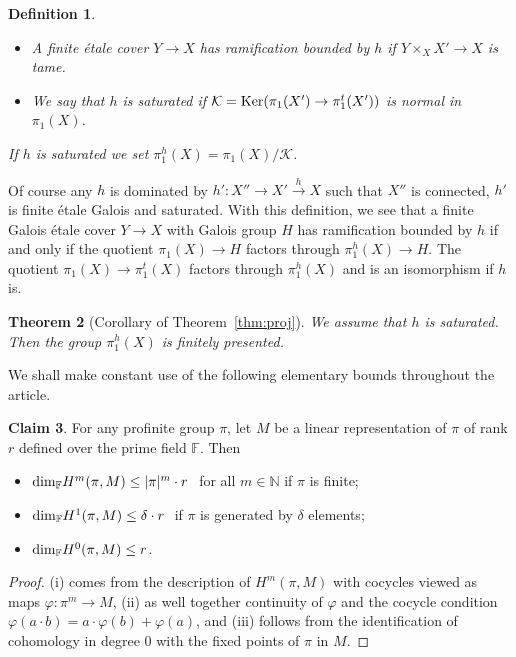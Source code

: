 \documentclass[12pt]{amsart}
\theoremstyle{plain}
\newtheorem{thm}{Theorem}
\newtheorem{defn}[thm]{Definition}
\theoremstyle{definition}
\newtheorem{claim}[thm]{Claim}
\numberwithin{thm}{section}
\newcommand{\sK}{{\mathcal K}}
\newcommand{\F}{{\mathbb F}}
\newcommand{\N}{{\mathbb N}}
\numberwithin{equation}{section}
\begin{document}
\begin{defn} \label{defn:drinfeld} 
\begin{itemize}
\item[1)]
 A finite \'etale cover $Y\to X$ has  ramification bounded by $h$ if $Y\times_X X'\to X$ is tame.
 \item[2)]
We say that $h$ is saturated if  $\sK={\rm Ker}(\pi_1(X')\to \pi_1^t(X'))$ is normal in $\pi_1(X)$. 
 \end{itemize}
 If $h$ is saturated we set $\pi_1^h(X)=\pi_1(X)/\sK$.
 \end{defn} 
 Of course any $h$ is dominated by $h': X''\to X'\xrightarrow{h} X$ such that $X''$ is connected, $h'$ is finite \'etale Galois and saturated. 
 With this definition, we see that a finite Galois \'etale cover $Y\to X$ with Galois group $H$ has ramification bounded by $h$ if and only if the quotient $\pi_1(X)\to H$ factors through $\pi_1^h(X)\to H$.  The quotient $\pi_1(X)\to \pi_1^t(X)$ factors through $\pi_1^h(X)$ and is an isomorphism if $h$ is. 

\begin{thm}[Corollary of Theorem~\ref{thm:proj}] \label{thm:Drinfeld}
We assume that $h$ is saturated. Then the  group $\pi_1^h(X)$ is finitely presented. 

\end{thm}

We shall make constant use of the following elementary bounds throughout the article.
\begin{claim}  \label{claim:elem} 
For any profinite group $\pi$, let $M$ be a linear representation of $\pi$ of rank $r$ defined over the prime field $\F$. 
Then 
\begin{itemize}
\item[(i)] $ {\rm dim}_{\F} H^m(\pi, M) \leq |\pi|^m \cdot r \ $ for all $m\in \N$ if $\pi$ is finite;
\item[(ii)]  $ {\rm dim}_{\F} H^1(\pi, M) \leq \delta \cdot r  \ $ if $\pi$ is generated by $\delta$ elements;
\item[(iii)]   $ {\rm dim}_{\F} H^0(\pi, M) \leq r$.
\end{itemize}
\end{claim}
\begin{proof}
(i) comes from the description of $H^m(\pi, M)$ with cocycles viewed as maps $\varphi: \pi^m\to M$, (ii) as well together continuity of $\varphi$ and   the cocycle condition $\varphi(a\cdot b)=a\cdot \varphi(b) + \varphi(a)$, and (iii) follows from the identification of cohomology in degree $0$ with the fixed points of $\pi$ in $M$.
\end{proof}
\end{document}

